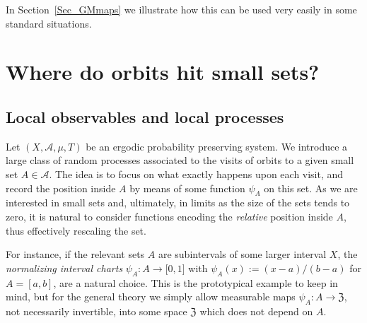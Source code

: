 \documentclass[AHL,Unicode,longabstracts]{cedram}
\newcommand{\clA}{\mathcal{A}}
\newcommand{\frkZ}{\mathfrak{Z}}
\begin{document}
In Section~\ref{Sec_GMmaps} we illustrate how this can be used very easily in some standard situations.



\section{Where do orbits hit small sets?}

\subsection{Local observables and local processes}
Let $(X,\clA,\mu,T)$ be an ergodic probability preserving system. We introduce a large class of random processes associated to the visits of orbits to a given small set $A\in\clA$. The idea is to focus on what exactly happens upon each visit, and record the position inside $A$ by means of some function $\psi_{A}$ on this set. As we are interested in small sets and, ultimately, in limits as the size of the sets tends to zero, it is natural to consider functions encoding the \emph{relative} position inside $A$, thus effectively rescaling the set.

For instance, if the relevant sets $A$ are subintervals of some larger interval $X$, the \emph{normalizing interval charts} $\psi_{A}:A\rightarrow
\lbrack0,1]$ with $\psi_{A}(x):=(x-a)/(b-a)$ for $A=[a,b]$, are a natural choice. This is the prototypical example to keep in mind, but for the general theory we simply allow measurable maps $\psi_{A}:A\rightarrow\frkZ$, not necessarily invertible, into some space $\frkZ$ which does not depend on $A$.
\end{document}

